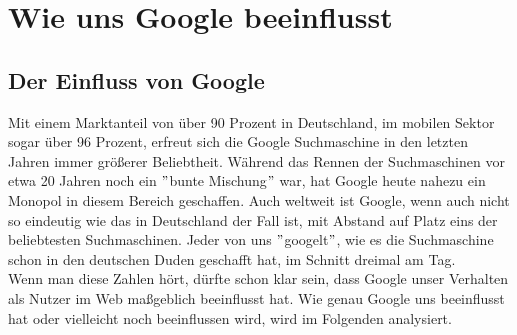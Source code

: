 \section{Wie uns Google beeinflusst}\label{sec:wie-uns-google-beeinflusst}

\subsection{Der Einfluss von Google}\label{subsec:der-einfluss-von-google}
Mit einem Marktanteil von über 90 Prozent in Deutschland, im mobilen Sektor sogar über 96 Prozent, erfreut sich die Google Suchmaschine in den letzten Jahren immer größerer Beliebtheit.
Während das Rennen der Suchmaschinen vor etwa 20 Jahren noch ein \("\)bunte Mischung\("\) war, hat Google heute nahezu ein Monopol in diesem Bereich geschaffen.
Auch weltweit ist Google, wenn auch nicht so eindeutig wie das in Deutschland der Fall ist, mit Abstand auf Platz eins der beliebtesten Suchmaschinen.
Jeder von uns \("\)googelt\("\)\cite{DUD22}, wie es die Suchmaschine schon in den deutschen Duden geschafft hat, im Schnitt dreimal am Tag.\cite{DOL22}\\
Wenn man diese Zahlen hört, dürfte schon klar sein, dass Google unser Verhalten als Nutzer im Web maßgeblich beeinflusst hat.
Wie genau Google uns beeinflusst hat oder vielleicht noch beeinflussen wird, wird im Folgenden analysiert.

